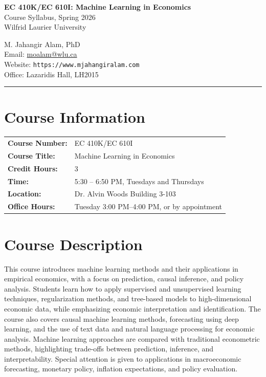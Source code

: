 \documentclass[11pt]{article}
\newcommand{\coloredsection}[1]{%
    \section*{\large\textcolor{sectioncolor}{#1}}%
}
\begin{document}

\begin{center}
\vspace*{-1.2cm}

{\LARGE \textbf{\textcolor{sectioncolor}{EC 410K/EC 610I: Machine Learning in Economics}}} \\[4pt]
{\normalsize Course Syllabus, Spring 2026} \\[3pt]
{\normalsize Wilfrid Laurier University}

\vspace{6pt}

M. Jahangir Alam, PhD \\
Email: \href{mailto:moalam@wlu.ca}{moalam@wlu.ca} \\
Website: \texttt{https://www.mjahangiralam.com} \\
Office: Lazaridis Hall, LH2015

\vspace{8pt}
\rule{\textwidth}{0.4pt}

\end{center}

\vspace{-0.3cm}

\coloredsection{Course Information}

\begin{tabular}{@{}ll@{}}
\textbf{Course Number:} & EC 410K/EC 610I \\
\textbf{Course Title:} & Machine Learning in Economics \\
\textbf{Credit Hours:} & 3 \\
\textbf{Time:} & 5:30 -- 6:50 PM, Tuesdays and Thursdays \\
\textbf{Location:} & Dr. Alvin Woods Building 3-103 \\
\textbf{Office Hours:} & Tuesday 3:00 PM--4:00 PM, or by appointment \\
\end{tabular}


\coloredsection{Course Description}

This course introduces machine learning methods and their applications in empirical economics, with a focus on prediction, causal inference, and policy analysis. Students learn how to apply supervised and unsupervised learning techniques, regularization methods, and tree-based models to high-dimensional economic data, while emphasizing economic interpretation and identification. The course also covers causal machine learning methods, forecasting using deep learning, and the use of text data and natural language processing for economic analysis. Machine learning approaches are compared with traditional econometric methods, highlighting trade-offs between prediction, inference, and interpretability. Special attention is given to applications in macroeconomic forecasting, monetary policy, inflation expectations, and policy evaluation.
\end{document}
